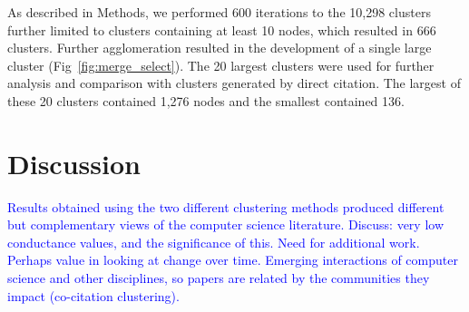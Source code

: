 As described in Methods, we performed 600 iterations to the 10,298 clusters further limited to clusters containing at least 10 nodes, which resulted in 666 clusters. Further agglomeration resulted in the development of a single large cluster (Fig~\ref{fig:merge_select}). 
The 20 largest clusters were used for further analysis and comparison with clusters generated by direct citation. The largest of these 20 clusters contained 1,276 nodes and the smallest contained 136.

\section{Discussion}
\textcolor{blue}{
Results obtained using the two different clustering methods produced different but complementary views of the computer
science literature.
Discuss: very low conductance values, and the significance of this. 
Need for additional work. 
Perhaps value in looking at change over time.
Emerging interactions of computer science and other disciplines, 
so papers are related by the communities they impact (co-citation clustering).
 }

